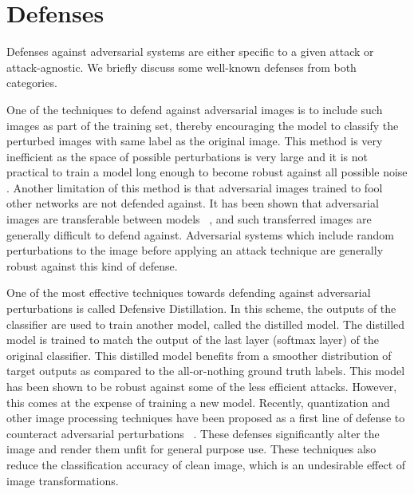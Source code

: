 \section{Defenses} \label{defenses}
Defenses against adversarial systems are either specific to a given attack or attack-agnostic. 
We briefly discuss some well-known defenses from both categories.

One of the techniques to defend against adversarial images is to include such images as part of the training set, thereby encouraging the model to classify the perturbed images with same label as the original image. 
This method is very inefficient as the space of possible perturbations is very large and it is not practical to train
a model long enough to become robust against all possible noise \cite{Tramr2017TheSO}. 
Another limitation of this method is that adversarial images trained to fool other networks are not defended against. 
It has been shown that adversarial images are transferable between models ~\cite{Liu2016DelvingIT}, and such transferred images are generally difficult to defend against.
Adversarial systems which include random perturbations to the image before applying an attack technique are generally robust against
this kind of defense.

One of the most effective techniques towards defending against adversarial perturbations is called Defensive Distillation.
In this scheme, the outputs of the classifier are used to train another model, called the distilled model. 
The distilled model is trained to match the output of the last layer (softmax layer) of the original classifier.
This distilled model benefits from a smoother distribution of target outputs as compared to the all-or-nothing ground truth labels.
This model has been shown to be robust against some of the less efficient attacks.
However, this comes at the expense of training a new model.
Recently, quantization and other image processing techniques have been proposed as a first line of defense to counteract adversarial perturbations ~\cite{liang2017detecting,aadityaprakash2018,guo2017countering}. 
These defenses significantly alter the image and render them unfit for general purpose use.
These techniques also reduce the classification accuracy of clean image, which is an undesirable effect of image transformations.

